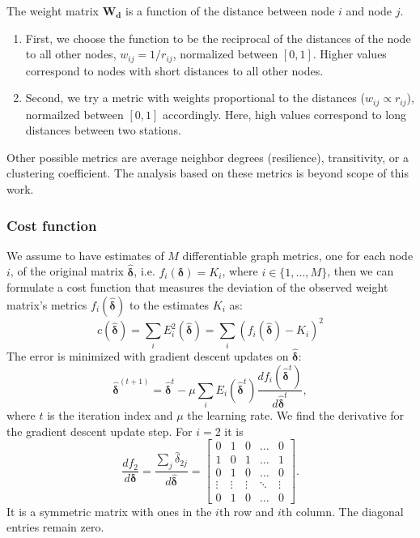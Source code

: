 \documentclass[12pt,a4paper,english]{article}
\begin{document}
The weight matrix $\bm{W_d}$ is a function of the distance between node $i$ and node $j$.
\begin{enumerate}
\item First, we choose the function to be the reciprocal of the distances of the node to all other nodes, $w_{ij}= 1/r_{ij}$, normalized between $[0,1]$. Higher values correspond to nodes with short distances to all other nodes.
\item Second, we try a metric with weights proportional to the distances ($w_{ij} \propto r_{ij}$), normailzed between $[0,1]$ accordingly. Here, high values correspond to long distances between two stations.
\end{enumerate}
Other possible metrics are average neighbor degrees (resilience), transitivity, or a clustering coefficient. The analysis based on these metrics is beyond scope of this work.  


\subsubsection{Cost function}
We assume to have estimates of $M$ differentiable graph metrics, one for each node $i$, of the original matrix $\bm{\hat{\delta}}$, i.e. $f_i(\bm{\delta}) = K_i$, where $i\in\{ 1,\dots, M \}$, then we can formulate a cost function that measures the deviation of the observed weight matrix's metrics $f_i(\bm{\hat{\delta}})$ to the estimates $K_i$ as: 
\begin{equation}
c(\bm{\hat{\delta}}) = \sum_i E_i^2(\bm{\hat{\delta}}) = \sum_i(f_i(\bm{\hat{\delta}})-K_i)^2
\end{equation}
The error is minimized with gradient descent updates on $\bm{\hat{\delta}}$: 
\begin{equation}
\bm{\hat{\delta}}^{(t+1)} = \bm{\hat{\delta}}^t-\mu\sum_i E_i(\bm{\hat{\delta}}^t)\frac{df_i(\bm{\hat{\delta}}^t)}{d\bm{\hat{\delta}}^t},
\label{eq:updates}
\end{equation}
where $t$ is the iteration index and $\mu$ the learning rate. %
We find the derivative for the gradient descent update step. For $i=2$ it is
\begin{equation}
\frac{df_2}{d\bm{\delta}}=\frac{\sum_j \hat{\delta}_{2j}}{d\bm{\hat{\delta}}}=
\begin{bmatrix}
    0 & 1 & 0 & \dots  & 0 \\
    1 & 0 & 1 & \dots  & 1 \\
    0 & 1 & 0 & \dots  & 0 \\
    \vdots & \vdots & \vdots & \ddots & \vdots \\
    0 & 1 & 0 & \dots  & 0
\end{bmatrix}.
\end{equation}
It is a symmetric matrix with ones in the $i$th row and $i$th column. The diagonal entries remain zero.
\end{document}
